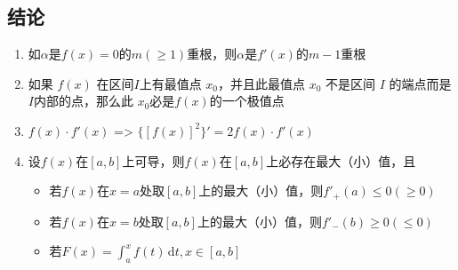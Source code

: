 \documentclass[../book.tex]{subfiles}
\begin{document}
        {\color{blue}{弯曲程度越大，曲率越大，曲率圆的半径越小}}

    \subsection{结论}

    \begin{enumerate}
        \item 如$\alpha$是$f(x) = 0$的$m(\geq 1)$重根，则$\alpha$是$f'(x)$的$m-1$重根
        \item 如果 $f(x)$ 在区间$I$上有最值点 $x_0$，并且此最值点 $x_0$ 不是区间 $I$ 的端点而是$I$内部的点，那么此 $x_0$必是$f(x)$的一个极值点
        \item $f(x)\cdot f'(x)$ => $\{[f(x)]^2\}' = 2f(x) \cdot f'(x)$
        \item 设$f(x)$在$[a, b]$上可导，则$f(x)$在$[a, b]$上必存在最大（小）值，且
        \begin{itemize}
            \item 若$f(x)$在$x = a$处取$[a, b]$上的最大（小）值，则$f'_+(a) \leq 0(\geq 0)$
            \item 若$f(x)$在$x = b$处取$[a, b]$上的最大（小）值，则$f'_-(b) \geq 0(\leq 0)$
            \item 若$F(x) = \int_a^x f(t)\,\mathrm{d}t, x \in [a, b]$
        \end{itemize}
    \end{enumerate}
\end{document}
